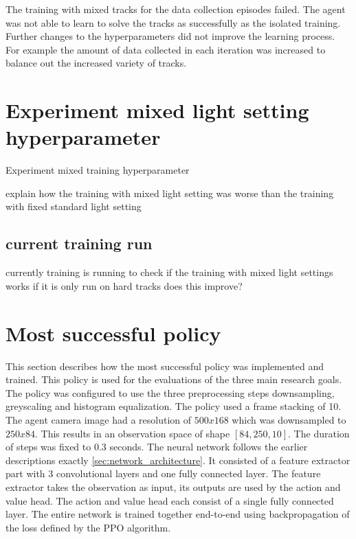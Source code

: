 The training with mixed tracks for the data collection episodes failed. The agent was not able to learn to solve the tracks as successfully as the isolated training. Further changes to the hyperparameters did not improve the learning process. For example the amount of data collected in each iteration was increased to balance out the increased variety of tracks.


\section{Experiment mixed light setting hyperparameter}
\label{cha:experiment_mixed_light}

Experiment mixed training hyperparameter

explain how the training with mixed light setting was worse than the training with fixed standard light setting

\subsection{current training run}
currently training is running to check if the training with mixed light settings works if it is only run on hard tracks
does this improve?


\section{Most successful policy}

This section describes how the most successful policy was implemented and trained. This policy is used for the evaluations of the three main research goals.
The policy was configured to use the three preprocessing steps downsampling, greyscaling and histogram equalization. The policy used a frame stacking of 10. The agent camera image had a resolution of $500x168$ which was downsampled to $250x84$. This results in an observation space of shape $[84, 250, 10]$. The duration of steps was fixed to $0.3$ seconds.
The neural network follows the earlier descriptions exactly \ref{sec:network_architecture}. It consisted of a feature extractor part with 3 convolutional layers and one fully connected layer. The feature extractor takes the observation as input, its outputs are used by the action and value head. The action and value head each consist of a single fully connected layer. The entire network is trained together end-to-end using backpropagation of the loss defined by the PPO algorithm.

